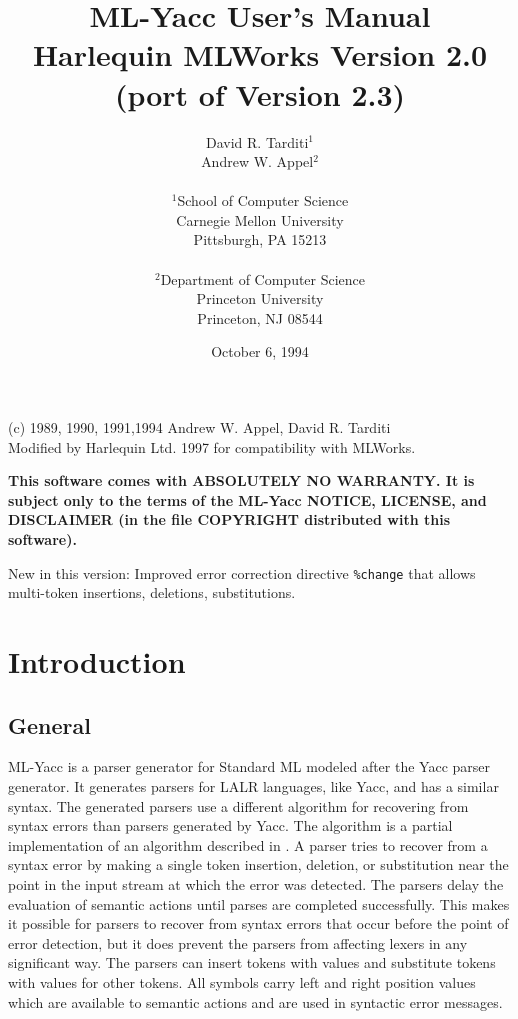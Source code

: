 \documentclass{article}
\title{                        ML-Yacc User's Manual \\
	Harlequin MLWorks Version 2.0 \\ (port of Version 2.3)
      }
\author{                David R. Tarditi$^1$\\
                        Andrew W. Appel$^2$\\
\\              
$^1$School of Computer Science \\
Carnegie Mellon University \\
Pittsburgh, PA 15213 \\
\\
$^2$Department of Computer Science \\
    Princeton University \\
    Princeton, NJ 08544 
}
\date{October 6, 1994}
\begin{document}
\maketitle
\begin{center}
(c) 1989, 1990, 1991,1994 Andrew W. Appel, David R. Tarditi \\
Modified by Harlequin Ltd. 1997 for compatibility with MLWorks.
\end{center}

{\bf
This software comes with ABSOLUTELY NO WARRANTY.  It is subject only to
the terms of the ML-Yacc NOTICE, LICENSE, and DISCLAIMER (in the
file COPYRIGHT distributed with this software).
}

New in this version:  Improved error correction directive \verb|%change|
that allows multi-token insertions, deletions, substitutions.

\newpage
\tableofcontents
\newpage

\section{Introduction}
\subsection{General}
ML-Yacc is a parser generator for Standard ML modeled after the
Yacc parser generator.  It generates parsers for LALR languages, like Yacc,
and has a similar syntax.  The generated parsers use a different algorithm 
for recovering from syntax errors than parsers generated by Yacc.  
The algorithm is a partial implementation of an algorithm described in \cite{bf}.
A parser tries to recover from a syntax error
by making a single token insertion, deletion, or
substitution near the point in the input stream at which the error
was detected.  The parsers delay the evaluation of semantic actions until
parses are completed successfully.  This makes it possible for
parsers to recover from syntax errors that occur before the point
of error detection, but it does prevent the parsers from
affecting lexers in any significant way.  The parsers
can insert tokens with values and substitute tokens with values
for other tokens. All symbols carry left and right position values
which are available to semantic actions and are used in
syntactic error messages.
\end{document}
